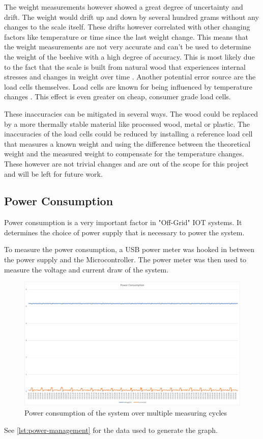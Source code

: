 The weight measurements however showed a great degree of uncertainty and drift. The weight would drift up and down by several hundred grams without any changes to the scale itself. These drifts however correlated with other changing factors like temperature or time since the last weight change. This means that the weight measurements are not very accurate and can't be used to determine the weight of the beehive with a high degree of accuracy. This is most likely due to the fact that the scale is built from natural wood that experiences internal stresses and changes in weight over time \cite{wood_deformation}. Another potential error source are the load cells themselves. Load cells are known for being influenced by temperature changes \cite{loadcell_temperature}. This effect is even greater on cheap, consumer grade load cells.

These inaccuracies can be mitigated in several ways. The wood could be replaced by a more thermally stable material like processed wood, metal or plastic. The inaccuracies of the load cells could be reduced by installing a reference load cell that measures a known weight and using the difference between the theoretical weight and the measured weight to compensate for the temperature changes. These however are not trivial changes and are out of the scope for this project and will be left for future work.

\subsection{Power Consumption}
Power consumption is a very important factor in "\Gls{Off-Grid}" \Gls{IOT} systems. It determines the choice of power supply that is necessary to power the system.

To measure the power consumption, a USB power meter was hooked in between the power supply and the \gls{Microcontroller}. The power meter was then used to measure the voltage and current draw of the system.

\begin{figure}
    \centering
    \includegraphics[width=1\textwidth]{figures/power_consumption_graph.png}
    \caption{Power consumption of the system over multiple measuring cycles}
    \label{fig:power_consumption}
\end{figure}
See \ref{lst:power-management} for the data used to generate the graph.

